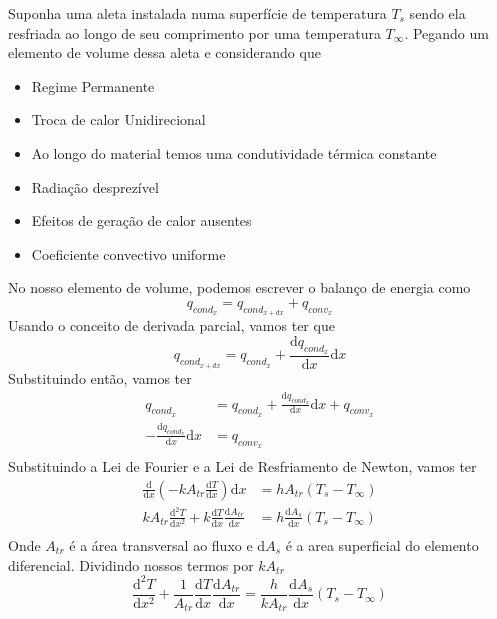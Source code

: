 Suponha uma aleta instalada numa superfície de temperatura \(T_s\) sendo ela resfriada ao longo de
seu comprimento por uma temperatura \(T_\infty \). Pegando um elemento de volume dessa aleta e
considerando que
\begin{itemize}
    \item Regime Permanente
    \item Troca de calor Unidirecional
    \item Ao longo do material temos uma condutividade térmica constante
    \item Radiação desprezível
    \item Efeitos de geração de calor ausentes
    \item Coeficiente convectivo uniforme
\end{itemize}
No nosso elemento de volume, podemos escrever o balanço de energia como
\begin{equation}
    q_{cond_x} = q_{cond_{x + dx}} + q_{conv_x}
\end{equation}
Usando o conceito de derivada parcial, vamos ter que
\begin{equation}
    q_{cond_{x+dx} } = q_{cond_x} + \frac{\mathrm{d}q_{cond_x} }{\mathrm{d}x} \mathrm{d} x
\end{equation} 
Substituindo então, vamos ter
\begin{align}
    q_{cond_x} &= q_{cond_x} + \frac{\mathrm{d}q_{cond_x} }{\mathrm{d}x} \mathrm{d} x + q_{conv_x}\\
    - \frac{\mathrm{d}q_{cond_x} }{\mathrm{d}x} \mathrm{d} x &= q_{conv_x}\\
\end{align}
Substituindo a Lei de Fourier e a Lei de Resfriamento de Newton, vamos ter
\begin{align}
    \frac{\mathrm{d}}{\mathrm{d}x} \left( -k A_{tr} \frac{\mathrm{d}T}{\mathrm{d}x}  \right) \mathrm{d} x &= h A_{tr} \left(T_s - T_\infty \right)\\
    k A_{tr} \frac{\mathrm{d}^2 T}{\mathrm{d}x^2} + k \frac{\mathrm{d}T}{\mathrm{d}x} \frac{\mathrm{d}A_{tr} }{\mathrm{d}x} &= h \frac{\mathrm{d}A_s}{\mathrm{d}x} \left(T_s - T_\infty \right)\\
\end{align}
Onde \(A_{tr} \) é a área transversal ao fluxo e \(\mathrm{d} A_s\) é a area superficial do elemento
diferencial. Dividindo nossos termos por \(k A_{tr} \)
\begin{equation}
    \frac{\mathrm{d}^2 T}{\mathrm{d}x^2} + \frac{1}{A_{tr} } \frac{\mathrm{d}T}{\mathrm{d}x} \frac{\mathrm{d}A_{tr} }{\mathrm{d}x} = \frac{h}{k A_{tr}} \frac{\mathrm{d}A_s}{\mathrm{d}x} \left(T_s - T_\infty \right)
\end{equation}
